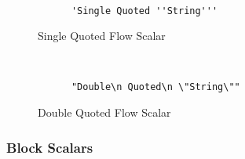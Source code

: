 \documentclass[a4paper, svgnames, 12pt]{article}
\begin{document}
\begin{figure}[H]
  \begin{minipage}[t]{0.48\textwidth}
    \vspace{0pt}
    \begin{bchart}[max=9, width=0.85\textwidth]
    \end{bchart}
  \end{minipage}
  \begin{minipage}[t]{0pt}~\end{minipage}
  \begin{minipage}[t]{0.48\textwidth}
    \vspace{0pt}
    \begin{verbatim}
      'Single Quoted ''String'''
    \end{verbatim}
  \end{minipage}
  \caption{Single Quoted Flow Scalar}
\end{figure}

\begin{figure}[H]
  \begin{minipage}[t]{0.48\textwidth}
    \vspace{0pt}
    \begin{bchart}[max=9, width=0.85\textwidth]
    \end{bchart}
  \end{minipage}
  \begin{minipage}[t]{0pt}~\end{minipage}
  \begin{minipage}[t]{0.48\textwidth}
    \vspace{0pt}
    \begin{verbatim}
      "Double\n Quoted\n \"String\""
    \end{verbatim}
  \end{minipage}
  \caption{Double Quoted Flow Scalar}
\end{figure}

\subsubsection{Block Scalars}
\end{document}
